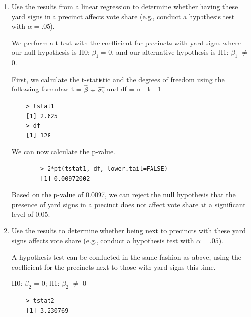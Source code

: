 \documentclass[12pt,letterpaper]{article}
\begin{document}
\vspace{.5cm}
\begin{enumerate}
	\item [(a)] Use the results from a linear regression to determine whether having these yard signs in a precinct affects vote share (e.g., conduct a hypothesis test with $\alpha = .05$).
	
	We perform a t-test with the coefficient for precincts with yard signs where our null hypothesis is H0: $\beta_1$ = 0, and our alternative hypothesis is H1: $\beta_1$ $\neq$ 0.
	
	First, we calculate the t-statistic and the degrees of freedom using the following formulas: t = $\hat{\beta}$ $\div$ $\hat{\sigma_\beta}$ and df = n - k - 1
	
	
	
\begin{verbatim}
	> tstat1
	[1] 2.625
	> df
	[1] 128
\end{verbatim}

	
	We can now calculate the p-value.
	
	
	\begin{verbatim}
		> 2*pt(tstat1, df, lower.tail=FALSE)
		[1] 0.00972002
	\end{verbatim}
	
	Based on the p-value of 0.0097, we can reject the null hypothesis that the presence of yard signs in a precinct does not affect vote share at a significant level of 0.05.
	
	\vspace{.5cm}
	\item [(b)]  Use the results to determine whether being
	next to precincts with these yard signs affects vote
	share (e.g., conduct a hypothesis test with $\alpha = .05$).
	
	A hypothesis test can be conducted in the same fashion as above, using the coefficient for the precincts next to those with yard signs this time.
	
	H0: $\beta_2$ = 0; H1: $\beta_2$ $\neq$ 0
	
	
	
\begin{verbatim}
	> tstat2
	[1] 3.230769
\end{verbatim}


\end{enumerate}
\end{document}
